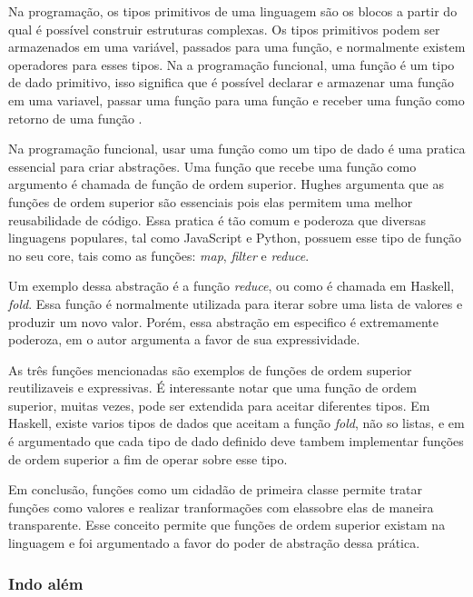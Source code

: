 Na programação, os tipos primitivos de uma linguagem são os blocos a partir do qual é possível construir estruturas complexas.
Os tipos primitivos podem ser armazenados em uma variável, passados para uma função, e normalmente existem operadores para esses tipos.
Na a programação funcional, uma função é um tipo de dado primitivo, isso significa que é possível declarar e armazenar uma função em uma variavel, passar uma função para uma função e receber uma função como retorno de uma função \cite{whyfpm}.

Na programação funcional, usar uma função como um tipo de dado é uma pratica essencial para criar abstrações.
Uma função que recebe uma função como argumento é chamada de função de ordem superior.
Hughes \cite{whyfpm} argumenta que as funções de ordem superior são essenciais pois elas permitem uma melhor reusabilidade de código.
Essa pratica é tão comum e poderoza que diversas linguagens populares, tal como JavaScript e Python, possuem esse tipo de função no seu core, tais como as funções: \emph{map}, \emph{filter} e \emph{reduce}.

Um exemplo dessa abstração é a função \emph{reduce}, ou como é chamada em Haskell, \emph{fold}.
Essa função é normalmente utilizada para iterar sobre uma lista de valores e produzir um novo valor.
Porém, essa abstração em especifico é extremamente poderoza, em \cite{graham} o autor argumenta a favor de sua expressividade.

As três funções mencionadas são exemplos de funções de ordem superior reutilizaveis e expressivas.
É interessante notar que uma função de ordem superior, muitas vezes, pode ser extendida para aceitar diferentes tipos.
Em Haskell, existe varios tipos de dados que aceitam a função \emph{fold}, não so listas, e em \cite{whyfpm} é argumentado que cada tipo de dado definido deve tambem implementar funções de ordem superior a fim de operar sobre esse tipo.


Em conclusão, funções como um cidadão de primeira classe permite tratar funções como valores e realizar tranformações com elassobre elas de maneira transparente.
Esse conceito permite que funções de ordem superior existam na linguagem e foi argumentado a favor do poder de abstração dessa prática.

\subsubsection{Indo além}

